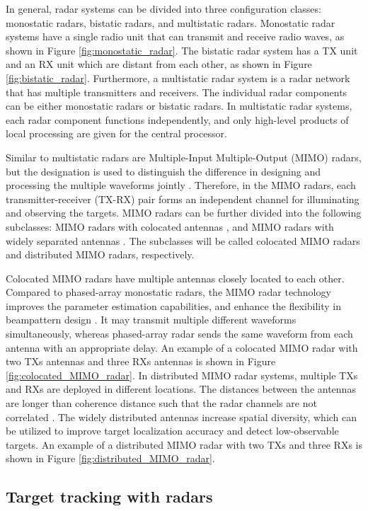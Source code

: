 \documentclass[english, 12pt, a4paper, elec, utf8, a-1b, online]{aaltothesis}
\numberwithin{equation}{section}
\begin{document}
In general, radar systems can be divided into three configuration classes: monostatic radars, bistatic radars, and multistatic radars.
Monostatic radar systems have a single radio unit that can transmit and receive radio waves, as shown in Figure \ref{fig:monostatic_radar}.
The bistatic radar system has a TX unit and an RX unit which are distant from each other, as shown in Figure \ref{fig:bistatic_radar}.
Furthermore, a multistatic radar system is a radar network that has multiple transmitters and receivers.
The individual radar components can be either monostatic radars or bistatic radars.
In multistatic radar systems, each radar component functions independently, and only high-level products of local processing are given for the central processor.

Similar to multistatic radars are Multiple-Input Multiple-Output (MIMO) radars, but the designation is used to distinguish the difference in designing and processing the multiple waveforms jointly \cite{Haimovich2008}.
Therefore, in the MIMO radars, each transmitter-receiver (TX-RX) pair forms an independent channel for illuminating and observing the targets.
MIMO radars can be further divided into the following subclasses: MIMO radars with colocated antennas \cite{Li2007}, and MIMO radars with widely separated antennas \cite{Haimovich2008}.
The subclasses will be called colocated MIMO radars and distributed MIMO radars, respectively.

Colocated MIMO radars have multiple antennas closely located to each other.
Compared to phased-array monostatic radars, the MIMO radar technology improves the parameter estimation capabilities, and enhance the flexibility in beampattern design \cite{Li2007}.
It may transmit multiple different waveforms simultaneously, whereas phased-array radar sends the same waveform from each antenna with an appropriate delay.
An example of a colocated MIMO radar with two TXs antennas and three RXs antennas is shown in Figure \ref{fig:colocated_MIMO_radar}.
In distributed MIMO radar systems, multiple TXs and RXs are deployed in different locations.
The distances between the antennas are longer than coherence distance such that the radar channels are not correlated \cite{Haimovich2008}.
The widely distributed antennas increase spatial diversity, which can be utilized to improve target localization accuracy and detect low-observable targets.
An example of a distributed MIMO radar with two TXs and three RXs is shown in Figure \ref{fig:distributed_MIMO_radar}.

\subsection{Target tracking with radars} \label{sec:Tracking}
\end{document}
